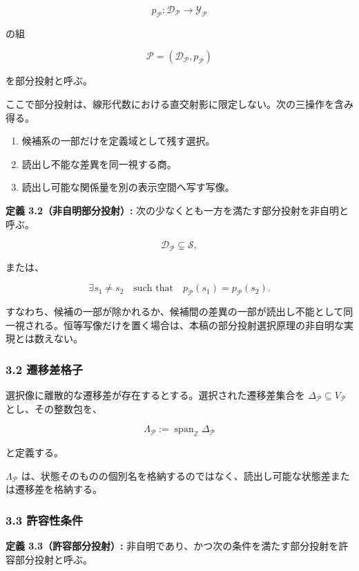 \documentclass[
  a4paper,
  ja=minimal,
  xelatex,
  paragraph-mark={},
]{bxjsarticle}
\providecommand{\tightlist}{%
  \setlength{\itemsep}{0pt}\setlength{\parskip}{0pt}}
\begin{document}
\[
p_{\mathcal P}:
\mathscr D_{\mathcal P}
\longrightarrow
\mathscr Y_{\mathcal P}
\]

の組

\[
\mathcal P
{}=
\left(
\mathscr D_{\mathcal P},
p_{\mathcal P}
\right)
\]

を部分投射と呼ぶ。

ここで部分投射は、線形代数における直交射影に限定しない。次の三操作を含み得る。

\begin{enumerate}
\def\labelenumi{\arabic{enumi}.}
\tightlist
\item
  候補系の一部だけを定義域として残す選択。
\item
  読出し不能な差異を同一視する商。
\item
  読出し可能な関係量を別の表示空間へ写す写像。
\end{enumerate}

\textbf{定義 3.2（非自明部分投射）:}
次の少なくとも一方を満たす部分投射を非自明と呼ぶ。

\[
\mathscr D_{\mathcal P}
\subsetneq
\mathscr S,
\]

または、

\[
\exists s_1\neq s_2
\quad\text{such that}\quad
p_{\mathcal P}(s_1)
{}=
p_{\mathcal P}(s_2).
\]

すなわち、候補の一部が除かれるか、候補間の差異の一部が読出し不能として同一視される。恒等写像だけを置く場合は、本稿の部分投射選択原理の非自明な実現とは数えない。

\subsubsection{3.2 遷移差格子}\label{ux9077ux79fbux5deeux683cux5b50}

選択像に離散的な遷移差が存在するとする。選択された遷移差集合を
\(\Delta_{\mathcal P}\subseteq V_{\mathcal P}\) とし、その整数包を、

\[
\Lambda_{\mathcal P}
:=
\operatorname{span}_{\mathbb Z}
\Delta_{\mathcal P}
\]

と定義する。

\(\Lambda_{\mathcal P}\)
は、状態そのものの個別名を格納するのではなく、読出し可能な状態差または遷移差を格納する。

\subsubsection{3.3 許容性条件}\label{ux8a31ux5bb9ux6027ux6761ux4ef6}

\textbf{定義 3.3（許容部分投射）:}
非自明であり、かつ次の条件を満たす部分投射を許容部分投射と呼ぶ。
\end{document}
